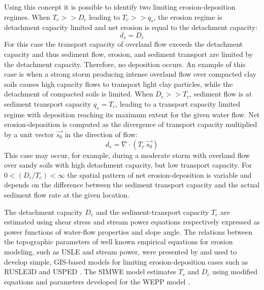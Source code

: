 \documentclass[gmd, manuscript]{copernicus}
\begin{document}
Using this concept it is possible to identify 
two limiting erosion-deposition regimes.
When $T_c >> D_c$ leading to $T_c >> q_s$, 
the erosion regime is detachment capacity limited and
net erosion is equal to the detachment capacity:
\begin{equation}
\label{eq:detachment_limited}
 d_s = D_c
\end{equation}
For this case the transport capacity of overland flow 
exceeds the detachment capacity 
and thus sediment flow, erosion, and sediment transport
are limited by the detachment capacity. 
Therefore, no deposition occurs.
An example of this case is when a strong storm 
producing intense %
overland flow over compacted clay soils 
causes high capacity flows to transport light clay particles,
while the detachment of compacted soils is limited.
%
When $D_c >> T_c$, sediment flow is at sediment transport capacity $q_s = T_c$, 
leading to a transport capacity limited regime 
with deposition reaching its maximum extent for the given water flow. 
Net erosion-deposition is computed as the divergence of
transport capacity multiplied by a unit vector $\vec{s_0}$ 
in the direction of flow:
\begin{equation}
\label{eq:transport_limited}
 d_s = \nabla\cdot (T_c ~ \vec{s_0})
\end{equation}
This case may occur, for example, during a moderate storm 
with overland flow over sandy soils 
with high detachment capacity, but low transport capacity.
%
For $0 < ({D_c / T_c}) < \infty$ 
the spatial pattern of net erosion-deposition is variable 
and depends on the difference between the sediment transport capacity 
and the actual sediment flow rate at the given location.

The detachment capacity $D_c $  and the sediment-transport capacity $T_c $  
are estimated using shear stress and stream power equations respectively
expressed as power functions of water-flow properties and slope angle.    
The relations between the topographic parameters 
of well known empirical equations for erosion modeling, 
such as USLE and stream power, were presented by \citet{Moore1986} 
and used to develop simple, GIS-based models for limiting erosion-deposition cases 
such as RUSLE3D and USPED \citep{Mitasova2001}.
The SIMWE model estimates $T_c$ and $D_c$ using modified 
equations and parameters developed for the WEPP model 
\citep{Flanagan2013,Mitasova2013}.
\end{document}
